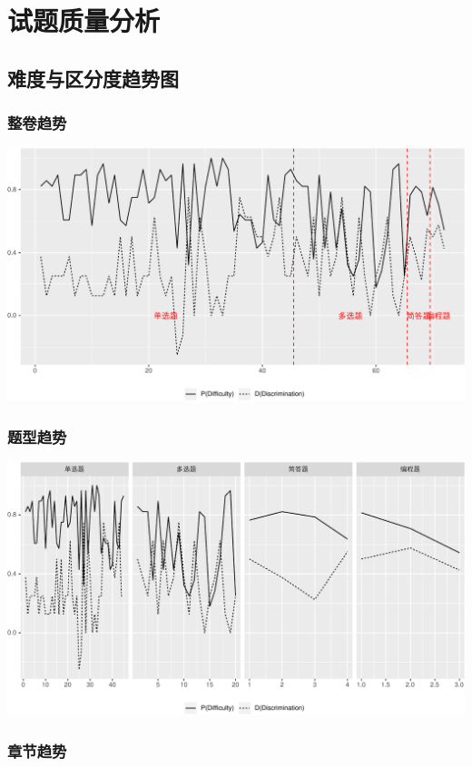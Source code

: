\documentclass[hyperref,adobefonts]{ctexart}
\begin{document}
\section{试题质量分析}

\subsection{难度与区分度趋势图}

\subsubsection{整卷趋势}

\includegraphics{ita_files/figure-latex/unnamed-chunk-14-1.pdf}

\subsubsection{题型趋势}

\includegraphics{ita_files/figure-latex/unnamed-chunk-16-1.pdf}

\subsubsection{章节趋势}
\end{document}
